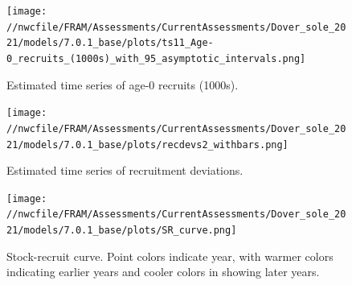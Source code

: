 \documentclass[11pt,
  english,
  a4paper,
]{article}
\begin{document}
\tagmcend\tagstructend


\begin{figure}
\centering
\texttt{[image: //nwcfile/FRAM/Assessments/CurrentAssessments/Dover\_sole\_2021/models/7.0.1\_base/plots/ts11\_Age-0\_recruits\_(1000s)\_with\_95\_asymptotic\_intervals.png]}
\caption{Estimated time series of age-0 recruits (1000s).\label{fig:recruits}}
\end{figure}

\tagmcend\tagstructend


\begin{figure}
\centering
\texttt{[image: //nwcfile/FRAM/Assessments/CurrentAssessments/Dover\_sole\_2021/models/7.0.1\_base/plots/recdevs2\_withbars.png]}
\caption{Estimated time series of recruitment deviations.\label{fig:rec-devs}}
\end{figure}

\tagmcend\tagstructend


\begin{figure}
\centering
\texttt{[image: //nwcfile/FRAM/Assessments/CurrentAssessments/Dover\_sole\_2021/models/7.0.1\_base/plots/SR\_curve.png]}
\caption{Stock-recruit curve. Point colors indicate year, with warmer colors indicating earlier years and cooler colors in showing later years.\label{fig:bh-curve}}
\end{figure}

\tagmcend\tagstructend

\end{document}
